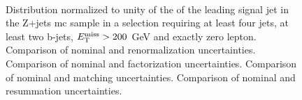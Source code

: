 \begin{figure}[h!]
\centering 
{}
\\
\caption{Distribution normalized to unity of the \pt of the leading signal jet in the Z+jets \gls{mc} sample in a selection requiring at least four jets, at least two b-jets, $E_{\rm T}^{\mathrm{miss}}>200$ GeV and exactly zero lepton. 
 Comparison of nominal and renormalization uncertainties.
 Comparison of nominal and factorization uncertainties.
 Comparison of nominal and matching uncertainties.
 Comparison of nominal and resummation uncertainties.
}\label{fig:W_met_0L_syst}
\end{figure}


